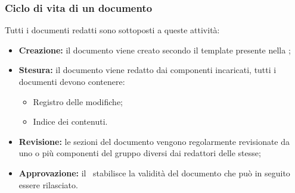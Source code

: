 \subsubsection{Ciclo di vita di un documento}\label{CicloDocumentazione}
Tutti i documenti redatti sono sottoposti a queste attività:
\begin{itemize}
	\item \textbf{Creazione:} il documento viene creato secondo il template presente nella ;
	\item \textbf{Stesura:} il documento viene redatto dai componenti incaricati, tutti i documenti devono contenere:
	\begin{itemize}
		\item Registro delle modifiche;
		\item Indice dei contenuti.
	\end{itemize}
	\item \textbf{Revisione:} le sezioni del documento vengono regolarmente revisionate da uno o più componenti del gruppo diversi dai redattori delle stesse;
	\item \textbf{Approvazione:} il \Responsabile\ stabilisce la validità del documento che può in seguito essere rilasciato. 
\end{itemize}

